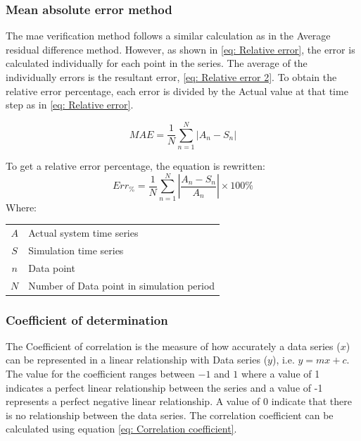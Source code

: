  		\subsubsection{Mean absolute error method}
 		The \gls{mae} verification method follows a similar calculation as in the Average residual difference method. However, as shown in \cref{eq: Relative error}, the error is calculated individually for each point in the series. The average of the individually errors is the resultant error, \cref{eq: Relative error 2}. To obtain the relative error percentage, each error is divided by the Actual value at that time step as in \cref{eq: Relative error}.
 		\par
 		\begin{equation}
 		\label{eq: Relative error 2}
 		MAE = \dfrac{1}{N}\sum_{n=1}^{N}{\left|A_{n} - S_{n}\right| }
 		\end{equation}
 		
 			To get a relative error percentage, the equation is rewritten:	
 			\begin{equation}
 			\label{eq: Relative error}
 			Err_{\%} = \dfrac{1}{N}\sum_{n=1}^{N}{\left|\dfrac{A_{n} - S_{n}}{A_{n}}\right| }\times 100 \%
 			\end{equation}
 			Where: \par
 			\begin{table}[h!]
 				\centering
 				\begin{tabular}{cl}
 					$A$ & Actual system time series \\
 					$S$ & Simulation time series \\
 					$n$ & Data point \\
 					$N$ & Number of Data point in simulation period \\
 				\end{tabular} 
 			\end{table} 
 		\subsubsection{Coefficient of determination}
 		The Coefficient of correlation is the measure of how accurately a data series ($ x $) can be represented in a linear relationship with Data series ($ y $), i.e. $ y = mx+c$. The value for the coefficient ranges between $ -1 $ and $ 1 $ where a value of 1 indicates a perfect linear relationship between the series and a value of -1 represents a perfect negative linear relationship. A value of 0 indicate that there is no relationship between the data series. The correlation coefficient can be calculated using equation \cref{eq: Correlation coefficient}.\cite{sarin2010comparing}
 		

